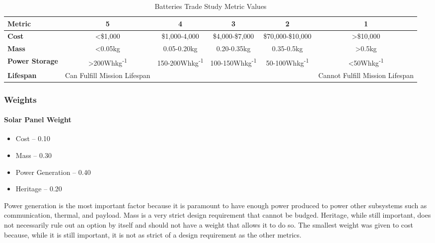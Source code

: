 \begin{table}[H]
\centering
\begin{tabular}{|l|c|c|c|c|c|} 
\hline
    \textbf{Metric} & \textbf{5} & \textbf{4} & \textbf{3} & \textbf{2} & \textbf{1}
    \\
\hline
    \textbf{Cost} & <\$1,000 & \$1,000-4,000 & \$4,000-\$7,000 & \$70,000-\$10,000 & >\$10,000 
    \\
\hline
    \textbf{Mass} & <0.05kg & 0.05-0.20kg & 0.20-0.35kg & 0.35-0.5kg & >0.5kg 
    \\    
\hline
    \textbf{Power Storage} & >200Whkg\textsuperscript{-1} & 150-200Whkg\textsuperscript{-1} & 100-150Whkg\textsuperscript{-1} & 50-100Whkg\textsuperscript{-1} & <50Whkg\textsuperscript{-1} 
    \\
\hline
    \textbf{Lifespan} &\multicolumn{1}{m{2.5cm}|}{Can Fulfill Mission Lifespan}& & & &\multicolumn{1}{m{3cm}|}{Cannot Fulfill Mission Lifespan}
    \\
\hline
\end{tabular}
\caption{Batteries Trade Study Metric Values}
\label{tbl:Batteries_Metric_Scores}
\end{table}
\subsubsection{Weights}
\paragraph{Solar Panel Weight}
\begin{itemize}
    \item Cost – 0.10
    \item Mass – 0.30
    \item Power Generation – 0.40
    \item Heritage – 0.20
\end{itemize}
Power generation is the most important factor because it is paramount to have enough power produced to power other subsystems such as communication, thermal, and payload.  Mass is a very strict design requirement that cannot be budged.  Heritage, while still important, does not necessarily rule out an option by itself and should not have a weight that allows it to do so.  The smallest weight was given to cost because, while it is still important, it is not as strict of a design requirement as the other metrics.
